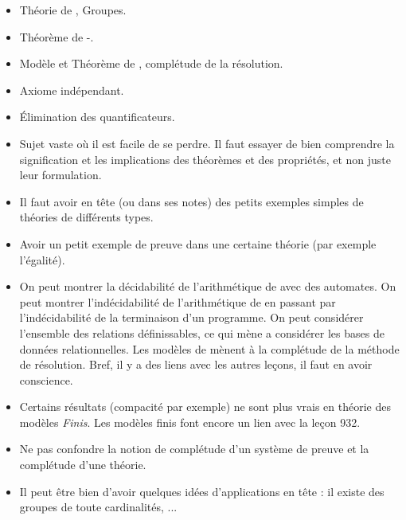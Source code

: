 \documentclass{agregfiche}
\begin{document}
\secidees

\begin{itemize}
    \item Théorie de , Groupes.
    \item Théorème de -.
    \item Modèle et Théorème de , complétude de la
    résolution.
    \item Axiome indépendant.
    \item Élimination des quantificateurs.
\end{itemize}

\secpieges

\begin{itemize}
    \item Sujet vaste où il est facile de se perdre. Il faut essayer
	de bien comprendre la signification et les implications des
	théorèmes et des propriétés, et non juste leur formulation.
    \item Il faut avoir en tête (ou dans ses notes) des petits
      exemples simples de théories de différents types.
    \item Avoir un petit exemple de preuve dans une certaine théorie
      (par exemple l'égalité).
    \item On peut montrer la décidabilité de l'arithmétique de
       avec des automates. On peut montrer
      l'indécidabilité
      de l'arithmétique de  en passant par l'indécidabilité
      de la
      terminaison d'un programme. On peut considérer l'ensemble des
      relations définissables, ce qui mène a considérer les bases de
      données relationnelles. Les modèles de  mènent à la
      complétude de la méthode de résolution. Bref, il y a des liens
      avec les autres
      leçons, il faut en avoir conscience.
    \item Certains résultats (compacité par exemple) ne sont plus vrais en théorie des modèles \emph{Finis}. Les modèles finis font encore un lien avec la leçon 932.
    \item Ne pas confondre la notion de complétude d'un système de
      preuve et la complétude d'une théorie.
    \item Il peut être bien d'avoir quelques idées d'applications en
      tête : il existe des groupes de toute cardinalités, ...
\end{itemize}

\secquestionsclassiques
\end{document}
